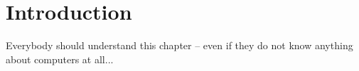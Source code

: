 \documentclass[../thesis.tex]{subfiles}
\begin{document}
\graphicspath{{../}}

\chapter{Introduction}
\label{chapter:intro}


Everybody should understand this chapter -- even if they do not know anything about computers at all...
\end{document}
